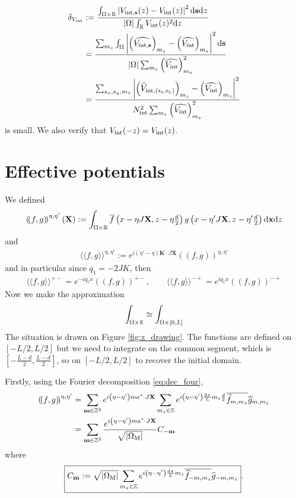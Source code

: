 \documentclass[11pt,a4paper,reqno,french,tikz]{amsart}
\def\d{{\rm d}}
\newcommand{\pa}[1]{\left( #1 \right)} %
\newcommand{\seg}[1]{\left[ #1 \right]} %
\newcommand{\ab}[1]{\left|#1\right|} %
\newcommand{\f}[2]{\frac{#1}{#2}} %
\newcommand{\ind}[1]{_{\textup{#1}}} %
\newcommand{\db}[1]{\left(\!\left( #1 \right)\!\right)}
\def\bX{{\mathbf X}}
\def\bx{{\mathbf x}}
\def\bmm{{\mathbf m}}
\def\bs{{\mathbf s}}
\def\bK{{\mathbf K}}
\newcommand{\dd}{\tfrac{d}{2}}
\newcommand{\sqom}{\sqrt{\ab{\Omega\ind{M}}}}
\def\lAngle{\langle\!\langle}
\def\rAngle{\rangle\!\rangle}
\begin{document}
\begin{align*}
	\delta_{V\ind{int}} &:= \f{\int_{\Omega\times \R} \ab{V_{\rm{int},\bs}(z) - V\ind{int}(z)}^2 \d \bs \d z}{\ab{\Omega} \int_{\R} V\ind{int}(z)^2 \d z} \\
&= \f{\sum_{m_z} \int_{\Omega} \ab{\pa{\widehat{V_{\rm{int},\bs}}}_{m_z} - \pa{\widehat{V\ind{int}}}_{m_z}}^2 \d \bs }{\ab{\Omega} \sum_{m_z}  \pa{\widehat{V\ind{int}}}_{m_z}^2} \\
&= \f{\sum_{s_x,s_y,m_z} \ab{\pa{\widehat{V}_{\rm{int},(s_x,s_y)}}_{m_z} - \pa{\widehat{V\ind{int}}}_{m_z}}^2 }{N\ind{int}^2 \sum_{m_z}  \pa{\widehat{V\ind{int}}}_{m_z}^2}
\end{align*}
is small. We also verify that $V\ind{int}(-z) = V\ind{int}(z)$.



\section{Effective potentials}%
\label{sec:effective_potentials}

We defined
\begin{align*}
\db{ f, g}^{\eta,\eta'}(\bX) :=   \int_{\Omega \times \R} \overline{f}\pa{x -\eta J\bX,z- \eta\dd} g\pa{x - \eta' J \bX, z- \eta'\dd} \d \bx \d z
\end{align*}
and
\begin{align*}
\boxed{\lAngle f, g \rAngle^{\eta,\eta'} := e^{i\pa{\eta'-\eta} \bK \cdot J \bX}\db{ f, g}^{\eta,\eta'}}
\end{align*}
and in particular since $q_1 = -2J K$, then
\begin{align*}
\lAngle f, g \rAngle^{+-} = e^{-iq_1 x}\db{ f, g}^{+-}, \qquad \lAngle f, g \rAngle^{-+} = e^{iq_1 x}\db{ f, g}^{-+}
\end{align*}
 Now we make the approximation
\begin{align*}
\int_{\Omega\times\R} \simeq  \int_{\Omega\times \seg{0,L}}
\end{align*}
The situation is drawn on Figure \ref{fig:z_drawing}. The functions are defined on $[-L/2,L/2]$ but we need to integrate on the common segment, which is $[-\f{L-d}{2},\f{L-d}{2}]$, so on $[-L/2,L/2]$ to recover the initial domain.




Firstly, using the Fourier decomposition \eqref{eq:dec_four},
\begin{align*}
	\db{f,g}^{\eta,\eta'} &=   \sum_{\bmm \in \Z^2} e^{i\pa{\eta-\eta'} ma^* \cdot J \bX} \sum_{m_z \in \Z} e^{i\pa{\eta-\eta'} \f{2\pi}{L} m_z \f{d}{2}} \overline{\widehat{f}_{m,m_z}} \widehat{g}_{m,m_z}\\
& = \sum_{\bmm \in \Z^2} \f{e^{i\pa{\eta-\eta'} ma^* \cdot J \bX}}{\sqom} C_{-\bmm}
\end{align*}
where
\begin{align*}
\boxed{C_\bmm := \sqom \sum_{m_z \in \Z} e^{i\pa{\eta-\eta'} \f{d\pi}{L} m_z} \overline{\widehat{f}_{-m,m_z}} \widehat{g}_{-m,m_z}}.
\end{align*}
\end{document}
